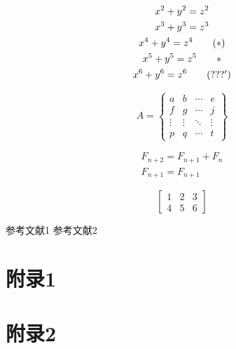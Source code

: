\documentclass[11pt,a4paper]{article}
\begin{document}
\begin{gather}
    x^2+y^2=z^2 \label{eq:r2} \\
    x^3+y^3=z^3 \notag \\
    x^4+y^4=z^4 \tag{$*$} \\
    x^5+y^5=z^5 \tag*{$*$} \\
    x^6+y^6=z^6 \tag{???$'$}
\end{gather}

$$
A=
\left\{
 \begin{matrix}
   a & b & \cdots & e\\
   f & g & \cdots & j \\
   \vdots & \vdots & \ddots & \vdots \\
   p & q & \cdots & t
  \end{matrix} 
\right\}
$$

$$
\begin{array}{c}
F_{n+2}=F_{n+1}+F_{n} \\ 
F_{n+1}=F_{n+1}
\end{array}
$$

$$
\left[
\begin{array}{cc|c}
1 & 2 & 3 \\
4 & 5 & 6
\end{array}
\right] 
$$

\begin{thebibliography}{99}
 参考文献1
 参考文献2
\end{thebibliography}
\begin{appendix}
\section{附录1}
\section{附录2}
\end{appendix}
\end{document}
